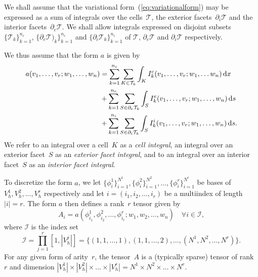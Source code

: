 We shall assume that the variational form~(\ref{eq:variationalform})
may be expressed as a sum of integrals over the cells~$\mathcal{T}$,
the exterior facets~$\partial_i \mathcal{T}$ and the interior
facets~$\partial_e \mathcal{T}$. We shall allow integrals expressed on
disjoint subsets $\{\mathcal{T}_k\}_{k=1}^{n_c}$, $\{\partial_e
\mathcal{T})_k\}_{k=1}^{n_e}$ and $\{\partial_i
\mathcal{T}_k\}_{k=1}^{n_i}$ of $\mathcal{T}$, $\partial_e
\mathcal{T}$ and $\partial_i \mathcal{T}$ respectively.

We thus assume that the form $a$ is given by
\begin{equation}
  \begin{split}
    a(v_1, \ldots, v_r; w_1, \ldots,  w_n)
    &=
    \sum_{k=1}^{n_c} \sum_{K\in\mathcal{T}_k} \int_{K}
    I^c_k(v_1, \ldots, v_r; w_1, \ldots w_n) \, \mathrm{d}x \\
    &+
    \sum_{k=1}^{n_e} \sum_{S\in\partial_e\mathcal{T}_k} \int_{S}
    I^e_k(v_1, \ldots, v_r; w_1, \ldots,  w_n) \, \mathrm{d}s \\
    &+
    \sum_{k=1}^{n_i} \sum_{S\in\partial_i\mathcal{T}_k} \int_{S}
    I^i_k(v_1, \ldots, v_r; w_1, \ldots, w_n) \, \mathrm{d}s.
  \end{split} \label{eq:form_integrals}
\end{equation}
We refer to an integral over a cell~$K$ as a \emph{cell integral},
an integral over an exterior facet~$S$ as an \emph{exterior facet integral},
and to an integral over an interior facet~$S$ as an \emph{interior facet integral}.


To discretize the form $a$, we let
$\{\phi_i^1\}_{i=1}^{N^1},
 \{\phi_i^2\}_{i=1}^{N^2}, \ldots,
 \{\phi_i^r\}_{i=1}^{N^r}$
be bases of $V_h^1, V_h^2, \ldots, V_h^r$ respectively and let $i =
(i_1, i_2, \ldots, i_r)$ be a multiindex of length $|i| = r$. The
form $a$ then defines a rank~$r$ tensor given by
\begin{equation} \label{eq:tensor}
  A_i = a(\phi_{i_1}^1, \phi_{i_2}^2, \ldots, \phi_{i_r}^r; w_1, w_2, \ldots, w_n)
  \quad \forall i \in \mathcal{I},
\end{equation}
where $\mathcal{I}$ is the index set
\begin{equation}
  \mathcal{I} = 
  \prod_{j=1}^r[1,|V^j_h|] = \{(1,1,\ldots,1), (1,1,\ldots,2), \ldots,
  (N^1,N^2,\ldots,N^r)\}.
\end{equation}
For any given form of arity~$r$, the tensor~$A$ is a
(typically sparse) tensor of rank~$r$ and dimension
$|V_h^1| \times |V_h^2| \times \ldots \times |V_h^r|
= N^1 \times N^2 \times \ldots \times N^r$.

